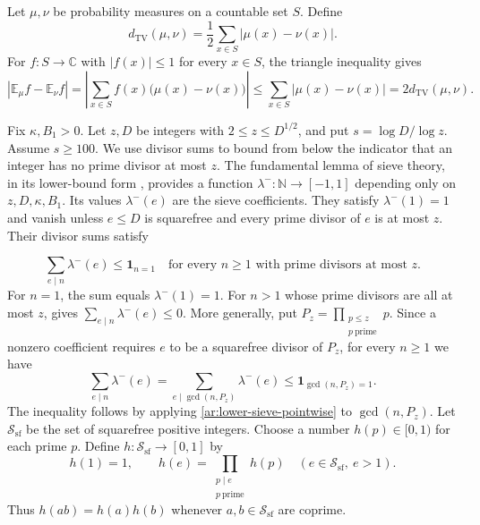 \documentclass[twoside]{aomart}
\theoremstyle{paperplain}
\theoremstyle{paperdefinition}
\newcommand{\N}{\mathbb N}
\newcommand{\TV}{d_{\mathrm{TV}}}
\numberwithin{equation}{section}
\begin{document}
Let $\mu,\nu$ be probability measures on a countable set $S$.
Define
\begin{equation}
 \TV(\mu,\nu)=\frac12\sum_{x\in S}|\mu(x)-\nu(x)|.
 \label{ar:countable-total-variation}
\end{equation}
For $f:S\to\mathbb C$ with $|f(x)|\le1$ for every $x\in S$,
the triangle inequality gives
\begin{equation}
 |\mathbb E_\mu f-\mathbb E_\nu f|=\left|\sum_{x\in S}f(x)\bigl(\mu(x)-\nu(x)\bigr)\right|\le\sum_{x\in S}|\mu(x)-\nu(x)|=2\TV(\mu,\nu).
 \label{ar:total-variation-expectation}
\end{equation}

Fix $\kappa,B_1>0$.
Let $z,D$ be integers with $2\le z\le D^{1/2}$, and put
$s=\log D/\log z$. Assume $s\ge100$.
We use divisor sums to bound from below the indicator that
an integer has no prime divisor at most $z$.
The fundamental lemma of sieve theory, in its lower-bound form
\cite[Theorem~3.6(a)]{FordSieve2023}, provides a function
$\lambda^-:\N\to[-1,1]$ depending only on $z,D,\kappa,B_1$.
Its values $\lambda^-(e)$ are the sieve coefficients.
They satisfy $\lambda^-(1)=1$ and vanish unless $e\le D$
is squarefree and every prime divisor of $e$ is at most $z$.
Their divisor sums satisfy

\begin{equation}
 \sum_{e\mid n}\lambda^-(e)\le\mathbf1_{n=1}
 \quad\text{for every }n\ge1\text{ with prime divisors at most }z.
 \label{ar:lower-sieve-pointwise}
\end{equation}
For $n=1$, the sum equals $\lambda^-(1)=1$.
For $n>1$ whose prime divisors are all at most $z$,
\cite[(3.1)]{FordSieve2023} gives
$\sum_{e\mid n}\lambda^-(e)\le0$.
More generally, put $P_z=\prod_{\substack{p\le z\\p\ \mathrm{prime}}}p$.
Since a nonzero coefficient requires $e$ to be a squarefree
divisor of $P_z$, for every $n\ge1$ we have
\begin{equation}
 \sum_{e\mid n}\lambda^-(e)
 =\sum_{e\mid\gcd(n,P_z)}\lambda^-(e)
 \le\mathbf1_{\gcd(n,P_z)=1}.
\end{equation}
The inequality follows by applying
\eqref{ar:lower-sieve-pointwise} to $\gcd(n,P_z)$.
Let $\mathcal S_{\mathrm{sf}}$ be the set of squarefree positive integers.
Choose a number $h(p)\in[0,1)$ for each prime $p$.
Define $h:\mathcal S_{\mathrm{sf}}\to[0,1]$ by
\begin{equation}
 h(1)=1,\qquad h(e)=\prod_{\substack{p\mid e\\p\ \mathrm{prime}}}h(p)
 \quad(e\in\mathcal S_{\mathrm{sf}},\ e>1).
\end{equation}
Thus $h(ab)=h(a)h(b)$ whenever
$a,b\in\mathcal S_{\mathrm{sf}}$ are coprime.
\end{document}
